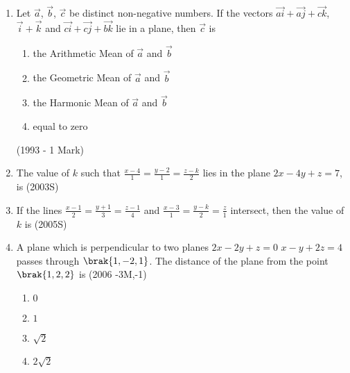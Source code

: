 \begin{enumerate}
\item Let $\vec{a}$, $\vec{b}$, $\vec{c}$ be distinct non-negative numbers. If the vectors $\vec{ai} + \vec{aj} + \vec{ck}$, $\vec{i}+\vec{k}$ and $\vec{ci}+\vec{cj}+\vec{bk}$ lie in a plane, then $\vec{c}$ is
\begin{enumerate}
\item the Arithmetic Mean of $\vec{a}$ and $\vec{b}$
\item the Geometric Mean of $\vec{a}$ and $\vec{b}$
\item the Harmonic Mean of $\vec{a}$ and $\vec{b}$
\item equal to zero
\end{enumerate}
\hfill (1993 - 1 Mark)
\item The value of $k$ such that $\frac{x-4}{1}=\frac{y-2}{1}=\frac{z-k}{2}$ lies in the plane $2x-4y+z=7$, is
\hfill (2003S)
\begin{enumerate}
\end{enumerate}
\item If the lines $\frac{x-1}{2}=\frac{y+1}{3}=\frac{z-1}{4}$ and $\frac{x-3}{1}=\frac{y-k}{2}=\frac{z}{1}$ intersect, then the value of $k$ is 
\hfill (2005S)
\begin{enumerate}
\end{enumerate}
    \item A plane which is perpendicular to two planes $2x-2y+z=0$  $x-y+2z=4$ passes through $\brak{1,-2,1}$. The distance of the plane from the point $\brak{1,2,2}$ is
    \hfill{(2006 -3M,-1)}
    \begin{multicols}{2} 
    	\begin{enumerate}
    		\item $0$
    		\item $1$
    		\item $\sqrt{2}$
    		\item $2\sqrt{2}$

\end{enumerate}
\end{multicols}
\end{enumerate}
